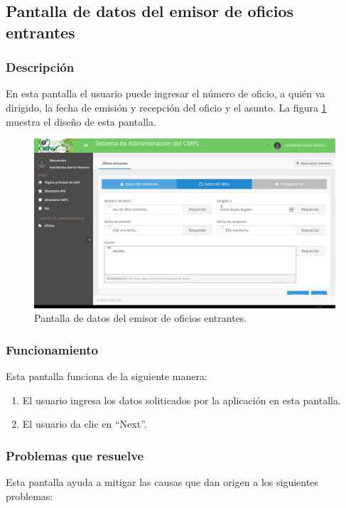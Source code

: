 \subsection{Pantalla de datos del emisor de oficios entrantes}
\subsubsection{Descripción}
	En esta pantalla el usuario puede ingresar el número de oficio, a quién va dirigido, la fecha de emisión y recepción del oficio y el asunto. La figura \ref{fig:Wizard2DatosDelOficio} muestra el diseño de esta pantalla.		
		
	\begin{figure}[htbp!]
		\centering
			\includegraphics[width=1\textwidth]{Pantallas/Wizard2DatosDelOficio.png}
		\caption{Pantalla de datos del emisor de oficios entrantes.}
		\label{fig:Wizard2DatosDelOficio}
	\end{figure}

\subsubsection{Funcionamiento}
	Esta pantalla funciona de la siguiente manera:
	
	\begin{enumerate}
		\item El usuario ingresa los datos soliticados por la aplicación en esta pantalla.
		\item El usuario da clic en ``Next''.
	\end{enumerate}

\subsubsection{Problemas que resuelve}
Esta pantalla ayuda a mitigar las causas que dan origen a los siguientes problemas:

